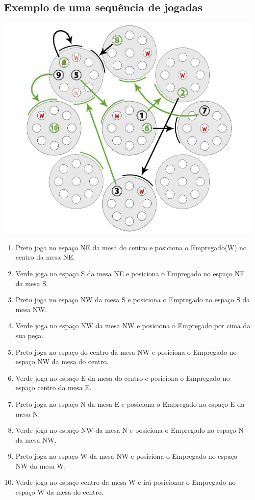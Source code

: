 \documentclass[a4paper]{article}
\begin{document}
\subsection{Exemplo de uma sequência de jogadas}
\includegraphics[scale=0.75]{board-jogadas.png}\linebreak\linebreak
\begin{enumerate}
\item Preto joga no espaço NE da mesa do centro e posiciona o Empregado(W) no centro da mesa NE.
\item Verde joga no espaço S da mesa NE e posiciona o Empregado no espaço NE da mesa S.
\item Preto joga no espaço NW da mesa S e posiciona o Empregado no espaço S da mesa NW.
\item Verde joga no espaço NW da mesa NW e posiciona o Empregado por cima da sua peça.
\item Preto joga no espaço do centro da mesa NW e posiciona o Empregado no espaço NW da mesa do centro.
\item Verde joga no espaço E da mesa do centro e posiciona o Empregado no espaço centro da mesa E.
\item Preto joga no espaço N da mesa E e posiciona o Empregado no espaço E da mesa N.
\item Verde joga no espaço NW da mesa N e posiciona o Empregado no espaço N da mesa NW.
\item Preto joga no espaço W da mesa NW e posiciona o Empregado no espaço NW da mesa W.
\item Verde joga no espaço centro da mesa W e irá posicionar o Empregado no espaço W da mesa do centro.
\end{enumerate}
\end{document}
